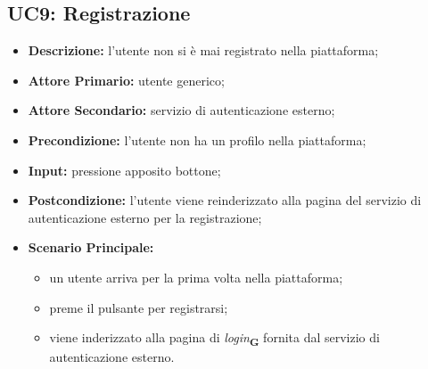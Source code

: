\subsection{UC9: Registrazione}
\label{sec:UC9}
\begin{itemize}
    \item \textbf{Descrizione:} l'utente non si è mai registrato nella piattaforma;
    \item \textbf{Attore Primario:} utente generico;
    \item \textbf{Attore Secondario:} servizio di autenticazione esterno;
    \item \textbf{Precondizione:} l'utente non ha un profilo nella piattaforma;
    \item \textbf{Input:} pressione apposito bottone;
    \item \textbf{Postcondizione:} l'utente viene reinderizzato alla pagina  del servizio di autenticazione esterno per la registrazione;
    \item \textbf{Scenario Principale:}
    \begin{itemize}
        \item un utente arriva per la prima volta nella piattaforma;
        \item preme il pulsante per registrarsi;
        \item viene inderizzato alla pagina di \textit{login}\textsubscript{\textbf{G}} fornita dal servizio di autenticazione esterno.
    \end{itemize}
\end{itemize}